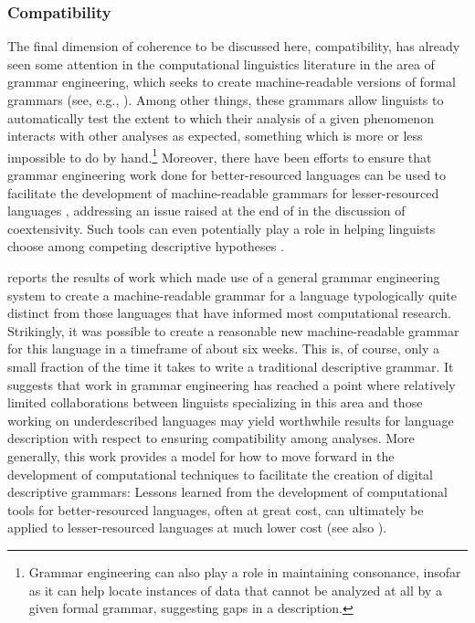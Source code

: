 \subsubsection{Compatibility\label{CompatibilitySec}}

The final dimension of coherence to be discussed here, compatibility, has
already seen some attention in the computational linguistics literature in the
area of grammar engineering, which seeks to create machine-readable versions of
formal grammars (see, e.g., ). Among other things, these
grammars allow linguists to automatically test the extent to which their
analysis of a given phenomenon interacts with other analyses as expected,
something which is more or less impossible to do by hand.{\footnote{Grammar
engineering can also play a role in maintaining consonance, insofar as it can help locate instances of data that
cannot be analyzed at all by a given formal grammar, suggesting gaps in a
description.}} Moreover, there have been efforts to ensure that grammar
engineering work done for better-resourced languages can be used to facilitate
the development of machine-readable grammars for lesser-resourced languages
\citep{BenderEtAl:2010}, addressing an issue raised at the end of
 in the discussion of coextensivity. Such tools can even
potentially play a role in helping linguists choose among competing descriptive
hypotheses \citep{Bender:2010}.

 reports the results of work which made use of a
general grammar engineering system to create a machine-readable grammar for a
language typologically quite distinct from those languages that have informed
most computational research. Strikingly, it was possible to create a reasonable
new machine-readable grammar for this language in a timeframe of about six
weeks. This is, of course, only a small fraction of the time it takes to write a
traditional descriptive grammar. It suggests that work in grammar engineering
has reached a point where relatively limited collaborations between linguists
specializing in this area and those working on underdescribed languages may
yield worthwhile results for language description with respect to ensuring
compatibility among analyses. More generally, this work provides a model for how
to move forward in the development of computational techniques to facilitate the
creation of digital descriptive grammars: Lessons learned from the development
of computational tools for better-resourced languages, often at great cost, can
ultimately be applied to lesser-resourced languages at much lower cost (see also
\citet{Bendertv}).

